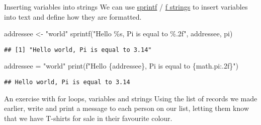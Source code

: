 \documentclass[
  10pt,
  ignorenonframetext,
  aspectratio=169]{beamer}
\newenvironment{Shaded}{\begin{snugshade}}{\end{snugshade}}
\newcommand{\BuiltInTok}[1]{\textcolor[rgb]{0.80,0.80,0.80}{#1}}
\newcommand{\FunctionTok}[1]{\textcolor[rgb]{0.94,0.94,0.56}{#1}}
\newcommand{\NormalTok}[1]{\textcolor[rgb]{0.80,0.80,0.80}{#1}}
\newcommand{\OperatorTok}[1]{\textcolor[rgb]{0.94,0.94,0.82}{#1}}
\newcommand{\OtherTok}[1]{\textcolor[rgb]{0.94,0.94,0.56}{#1}}
\newcommand{\SpecialCharTok}[1]{\textcolor[rgb]{0.86,0.64,0.64}{#1}}
\newcommand{\SpecialStringTok}[1]{\textcolor[rgb]{0.80,0.58,0.58}{#1}}
\newcommand{\StringTok}[1]{\textcolor[rgb]{0.80,0.58,0.58}{#1}}
\begin{document}
\begin{frame}[fragile]{Inserting variables into strings}
\protect\hypertarget{inserting-variables-into-strings}{}
We can use
\href{https://www.rdocumentation.org/packages/base/versions/3.6.2/topics/sprintf}{sprintf}
/ \href{https://peps.python.org/pep-0498/}{f strings} to insert
variables into text and define how they are formatted.

\scriptsize
\medskip

\begin{Shaded}
\begin{Highlighting}[]
\NormalTok{addressee }\OtherTok{\textless{}{-}} \StringTok{"world"}
\FunctionTok{sprintf}\NormalTok{(}\StringTok{"Hello \%s, Pi is equal to \%.2f"}\NormalTok{, addressee, pi)}
\end{Highlighting}
\end{Shaded}

\begin{verbatim}
## [1] "Hello world, Pi is equal to 3.14"
\end{verbatim}

\medskip

\begin{Shaded}
\begin{Highlighting}[]
\NormalTok{addressee }\OperatorTok{=} \StringTok{"world"}
\BuiltInTok{print}\NormalTok{(}\SpecialStringTok{f"Hello }\SpecialCharTok{\{}\NormalTok{addressee}\SpecialCharTok{\}}\SpecialStringTok{, Pi is equal to }\SpecialCharTok{\{}\NormalTok{math}\SpecialCharTok{.}\NormalTok{pi}\SpecialCharTok{:.2f\}}\SpecialStringTok{"}\NormalTok{)}
\end{Highlighting}
\end{Shaded}

\begin{verbatim}
## Hello world, Pi is equal to 3.14
\end{verbatim}
\end{frame}

\begin{frame}{An exercise with for loops, variables and strings}
\protect\hypertarget{an-exercise-with-for-loops-variables-and-strings}{}
Using the list of records we made earlier, write and print a message to
each person on our list, letting them know that we have T-shirts for
sale in their favourite colour.
\end{frame}
\end{document}
